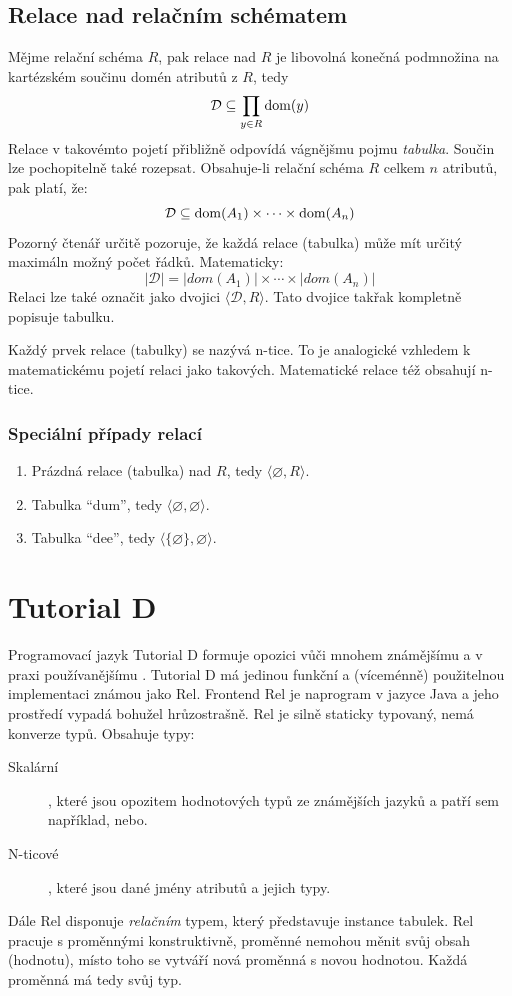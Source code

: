 \subsection{Relace nad relačním schématem}
\begin{uptheorem}
Mějme relační schéma $R$, pak relace nad $R$ je libovolná konečná podmnožina na kartézském součinu domén atributů z $R$, tedy
$$
\mathcal{D} \subseteq \prod_{y \in R} \operatorname{dom}(y)
$$
Relace v takovémto pojetí přibližně odpovídá vágnějšmu pojmu \textit{tabulka}. Součin lze pochopitelně také rozepsat. Obsahuje-li relační schéma $R$ celkem $n$ atributů, pak platí, že:
$$
\mathcal{D} \subseteq \operatorname{dom}(A_{1}) \times \cdots \times \operatorname{dom}(A_{n})
$$
Pozorný čtenář určitě pozoruje, že každá relace (tabulka) může mít určitý maximáln možný počet řádků. Matematicky:
$$
|\mathcal{D}| = |dom(A_{1})| \times \cdots \times |dom(A_{n})|
$$
Relaci lze také označit jako dvojici $\langle \mathcal{D}, R \rangle$. Tato dvojice takřak kompletně popisuje tabulku.
\end{uptheorem}
Každý prvek relace (tabulky) se nazývá n-tice. To je analogické vzhledem k matematickému pojetí relaci jako takových. Matematické relace též obsahují n-tice.

\subsubsection{Speciální případy relací}
\begin{enumerate}
\item Prázdná relace (tabulka) nad $R$, tedy $\langle \varnothing, R \rangle$.
\item Tabulka \enquote{dum}, tedy $\langle \varnothing, \varnothing \rangle$.
\item Tabulka \enquote{dee}, tedy $\langle \lbrace \varnothing \rbrace, \varnothing \rangle$.
\end{enumerate}

\section{Tutorial D}
Programovací jazyk Tutorial D formuje opozici vůči mnohem známějšímu a v praxi používanějšímu . Tutorial D má jedinou funkční a (víceménně) použitelnou implementaci známou jako Rel. Frontend Rel je naprogram v jazyce Java a jeho prostředí vypadá bohužel hrůzostrašně. Rel je silně staticky typovaný, nemá konverze typů. Obsahuje typy:
\begin{description}
\item[Skalární], které jsou opozitem hodnotových typů ze známějších jazyků a patří sem například, nebo.
\item[N-ticové], které jsou dané jmény atributů a jejich typy.
\end{description}
Dále Rel disponuje \textit{relačním} typem, který představuje instance tabulek. Rel pracuje s proměnnými konstruktivně, proměnné nemohou měnit svůj obsah (hodnotu), místo toho se vytváří nová proměnná s novou hodnotou. Každá proměnná má tedy svůj typ.

